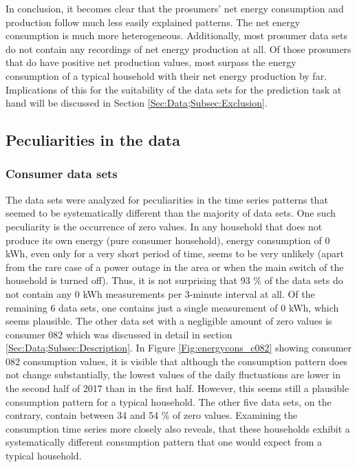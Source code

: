In conclusion, it becomes clear that the prosumers' net energy consumption and production follow much less easily explained patterns. The net energy consumption is much more heterogeneous. Additionally, most prosumer data sets do not contain any recordings of net energy production at all. Of those prosumers that do have positive net production values, most surpass the energy consumption of a typical household with their net energy production by far. Implications of this for the suitability of the data sets for the prediction task at hand will be discussed in Section \ref{Sec:Data;Subsec:Exclusion}.


\subsection{Peculiarities in the data}\label{Sec:Data;Subsec:Peculiarities}

\subsubsection{Consumer data sets}

The data sets were analyzed for peculiarities in the time series patterns that seemed to be systematically different than the majority of data sets. One such peculiarity is the occurrence of zero values. In any household that does not produce its own energy (pure consumer household), energy consumption of 0 kWh, even only for a very short period of time, seems to be very unlikely (apart from the rare case of a power outage in the area or when the main switch of the household is turned off). Thus, it is not surprising that 93 \% of the data sets do not contain any 0 kWh measurements per 3-minute interval at all. Of the remaining 6 data sets, one contains just a single measurement of 0 kWh, which seems plausible. The other data set with a negligible amount of zero values is consumer 082 which was discussed in detail in section \ref{Sec:Data;Subsec:Description}. In Figure \ref{Fig:energycons_c082} showing consumer 082 consumption values, it is visible that although the consumption pattern does not change substantially, the lowest values of the daily fluctuations are lower in the second half of 2017 than in the first half. However, this seems still a plausible consumption pattern for a typical household. The other five data sets, on the contrary, contain between 34 and 54 \% of zero values. Examining the consumption time series more closely also reveals, that these households exhibit a systematically different consumption pattern that one would expect from a typical household.

